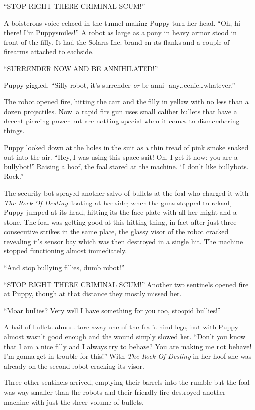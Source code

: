 ``STOP RIGHT THERE CRIMINAL SCUM!''

A boisterous voice echoed in the tunnel making Puppy turn her head. ``Oh, hi there! I'm Puppysmiles!'' A robot as large as a pony in heavy armor stood in front of the filly. It had the Solaris Inc. brand on its flanks and a couple of firearms attached to eachside.

``SURRENDER NOW AND BE ANNIHILATED!''

Puppy giggled. ``Silly robot, it's surrender \emph{or} be anni- any\dots eenie\dots whatever.''

The robot opened fire, hitting the cart and the filly in yellow with no less than a dozen projectiles. Now, a rapid fire gun uses small caliber bullets that have a decent piercing power but are nothing special when it comes to dismembering things.

Puppy looked down at the holes in the suit as a thin tread of pink smoke snaked out into the air. ``Hey, I was using this space suit! Oh, I get it now: you are a bullybot!'' Raising a hoof, the foal stared at the machine. ``I don't like bullybots. Rock.''

The security bot sprayed another salvo of bullets at the foal who charged it with \emph{The Rock Of Destiny} floating at her side; when the guns stopped to reload, Puppy jumped at its head, hitting its the face plate with all her might and a stone. The foal was getting good at this hitting thing, in fact after just three consecutive strikes in the same place, the glassy visor of the robot cracked revealing it's sensor bay which was then destroyed in a single hit. The machine stopped functioning almost immediately.

``And stop bullying fillies, dumb robot!''

``STOP RIGHT THERE CRIMINAL SCUM!'' Another two sentinels opened fire at Puppy, though at that distance they mostly missed her.

``Moar bullies? Very well I have something for you too, stoopid bullies!''

A hail of bullets almost tore away one of the foal's hind legs, but with Puppy almost wasn't good enough and the wound simply slowed her. ``Don't you know that I am a nice filly and I always try to behave? You are making me not behave! I'm gonna get in trouble for this!'' With \emph{The Rock Of Destiny} in her hoof she was already on the second robot cracking its visor.

Three other sentinels arrived, emptying their barrels into the rumble but the foal was way smaller than the robots and their friendly fire destroyed another machine with just the sheer volume of bullets.

